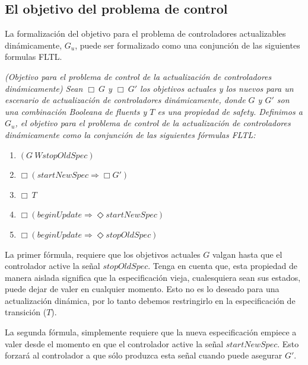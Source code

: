 \subsection{El objetivo del problema de control}

La formalización del objetivo para el problema de controladores actualizables dinámicamente, $G_u$, puede ser formalizado
como una conjunción de las siguientes formulas FLTL.

\begin{nahaDef}
\label{update_goals_def}
\emph{(Objetivo para el problema de control de la actualización de controladores dinámicamente) Sean $\Box\ G$ y $\Box\ G'$
los objetivos actuales y los nuevos para un escenario de actualización de controladores dinámicamente, donde $G$ y $G'$
son una combinación Booleana de fluents y $T$ es una propiedad de safety. Definimos a $G_u$, el objetivo para el
problema de control de la actualización de controladores dinámicamente como la conjunción de las siguientes fórmulas
FLTL:}

\begin{enumerate}
\itemsep-4mm
\item $(G\ W stopOldSpec)$
\item $\Box(startNewSpec \Longrightarrow \Box G')$
\item $\Box\ T$
\item $\Box(beginUpdate \Longrightarrow \Diamond startNewSpec)$
\item $\Box(beginUpdate \Longrightarrow \Diamond stopOldSpec)$
\end{enumerate}
\end{nahaDef}

La primer fórmula, requiere que los objetivos actuales $G$ valgan hasta que el controlador active la señal $stopOldSpec$.
Tenga en cuenta que, esta propiedad de manera aislada significa que la especificación vieja, cualesquiera sean sus estados,
puede dejar de valer en cualquier momento. Esto no es lo deseado para una actualización dinámica, por lo tanto debemos
restringirlo en la especificación de transición ($T$).

La segunda fórmula, simplemente requiere que la nueva especificación empiece a valer desde el momento en que el
controlador active la señal $startNewSpec$. Esto forzará al controlador a que sólo produzca esta señal cuando puede
asegurar $G'$.

